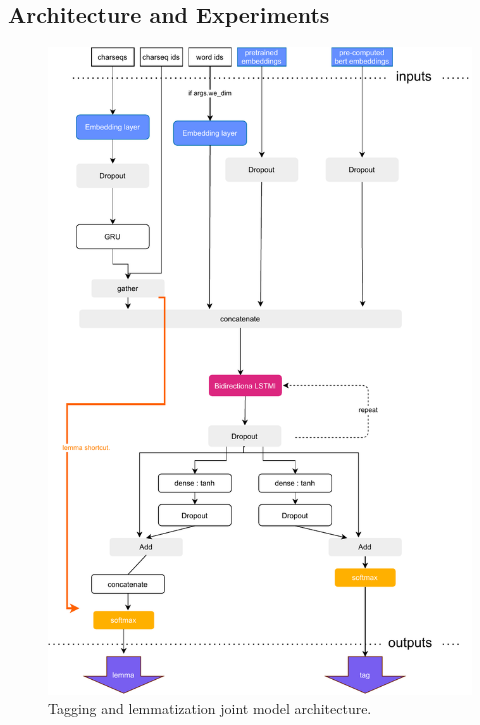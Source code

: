\subsection{Architecture and Experiments}
\begin{figure}[!h]
\centering
\includegraphics[width=1\columnwidth]{../img/taggermodel.pdf}
\protect\caption{Tagging and lemmatization joint model architecture.}
\label{pic:lt_arch}
\end{figure}


